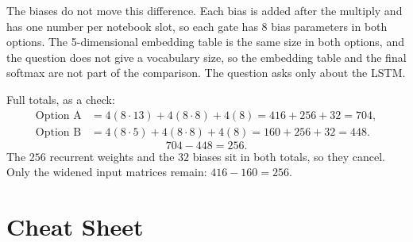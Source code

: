 \documentclass[11pt]{article}
\begin{document}
The biases do not move this difference. Each bias is added after the
multiply and has one number per notebook slot, so each gate has 8 bias
parameters in both options. The 5-dimensional embedding table is the same
size in both options, and the question does not give a vocabulary size, so
the embedding table and the final softmax are not part of the comparison.
The question asks only about the LSTM.

Full totals, as a check:
\begin{align*}
\text{Option A}
&=
4(8\cdot 13)+4(8\cdot 8)+4(8)
=
416+256+32
=
704,\\
\text{Option B}
&=
4(8\cdot 5)+4(8\cdot 8)+4(8)
=
160+256+32
=
448.
\end{align*}
\[
704-448=256.
\]
The \(256\) recurrent weights and the \(32\) biases sit in both totals, so
they cancel. Only the widened input matrices remain:
\(416-160=256\).

\section{Cheat Sheet}
\end{document}
